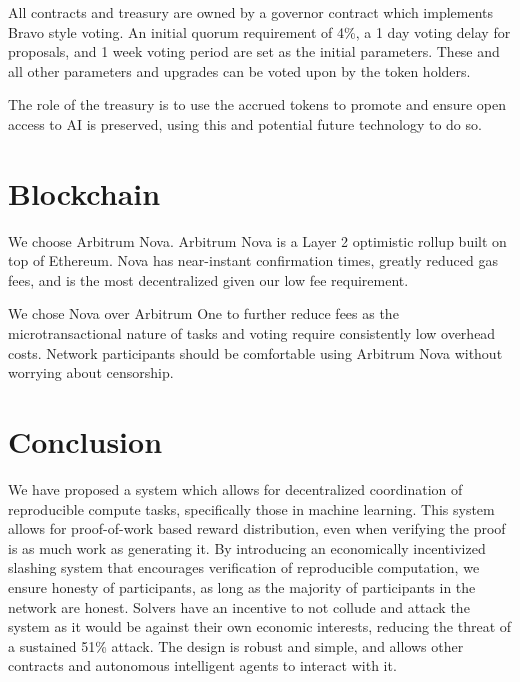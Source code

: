 \documentclass{article}
\begin{document}
All contracts and treasury are owned by a governor contract which implements Bravo\cite{bravo} style voting. An initial quorum requirement of 4\%, a 1 day voting delay for proposals, and 1 week voting period are set as the initial parameters. These and all other parameters and upgrades can be voted upon by the token holders.

The role of the treasury is to use the accrued tokens to promote and ensure open access to AI is preserved, using this and potential future technology to do so.


\section{Blockchain}

We choose Arbitrum Nova\cite{arbitrumnitro}. Arbitrum Nova is a Layer 2 optimistic rollup built on top of Ethereum. Nova has near-instant confirmation times, greatly reduced gas fees, and is the most decentralized given our low fee requirement.

We chose Nova over Arbitrum One to further reduce fees as the microtransactional nature of tasks and voting require consistently low overhead costs. Network participants should be comfortable using Arbitrum Nova without worrying about censorship.

\section{Conclusion}

We have proposed a system which allows for decentralized coordination of reproducible compute tasks, specifically those in machine learning. This system allows for proof-of-work based reward distribution, even when verifying the proof is as much work as generating it. By introducing an economically incentivized slashing system that encourages verification of reproducible computation, we ensure honesty of participants, as long as the majority of participants in the network are honest. Solvers have an incentive to not collude and attack the system as it would be against their own economic interests, reducing the threat of a sustained 51\% attack. The design is robust and simple, and allows other contracts and autonomous intelligent agents to interact with it.


\printbibliography{}

\newpage
\end{document}
